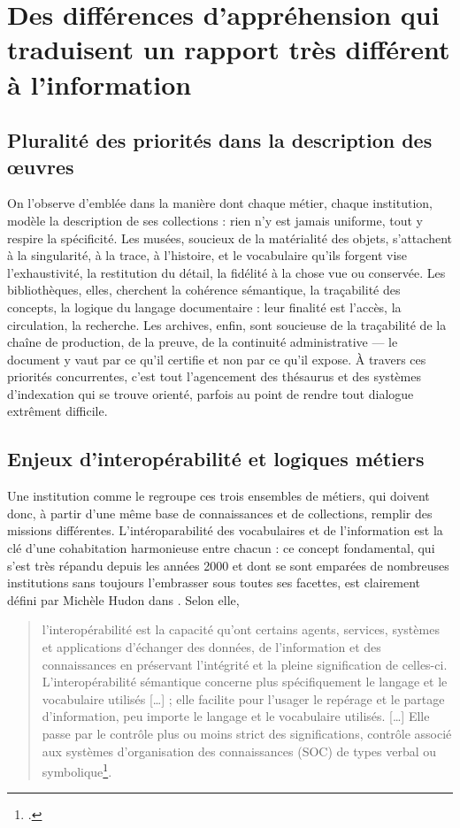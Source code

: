 \section{\label{II-B-2}Des différences d’appréhension qui traduisent un rapport très différent à l’information}


\subsection{Pluralité des priorités dans la description des œuvres}

On l’observe d’emblée dans la manière dont chaque métier, chaque institution, modèle la description de ses collections : rien n’y est jamais uniforme, tout y respire la spécificité. Les musées, soucieux de la matérialité des objets, s’attachent à la singularité, à la trace, à l’histoire, et le vocabulaire qu’ils forgent vise l’exhaustivité, la restitution du détail, la fidélité à la chose vue ou conservée. Les bibliothèques, elles, cherchent la cohérence sémantique, la traçabilité des concepts, la logique du langage documentaire : leur finalité est l’accès, la circulation, la recherche. Les archives, enfin, sont soucieuse de la traçabilité de la chaîne de production, de la preuve, de la continuité administrative — le document y vaut par ce qu’il certifie et non par ce qu’il expose. À travers ces priorités concurrentes, c’est tout l’agencement des thésaurus et des systèmes d’indexation qui se trouve orienté, parfois au point de rendre tout dialogue extrêment difficile.

\subsection{Enjeux d’interopérabilité et logiques métiers}

Une institution comme le \mae regroupe ces trois ensembles de métiers, qui doivent donc, à partir d'une même base de connaissances et de collections, remplir des missions différentes. L'intéroparabilité des vocabulaires et de l'information est la clé d'une cohabitation harmonieuse entre chacun : ce concept fondamental, qui s'est très répandu depuis les années 2000 et dont se sont emparées de nombreuses institutions sans toujours l'embrasser sous toutes ses facettes, est clairement défini par Michèle Hudon dans . Selon elle, 
\begin{quote}
	l’interopérabilité est la capacité qu’ont certains agents, services, systèmes et applications d’échanger des données, de l’information et des connaissances en préservant l’intégrité et la pleine signification de celles-ci. L’interopérabilité sémantique concerne plus spécifiquement le langage et le vocabulaire utilisés […] ; elle facilite pour l’usager le repérage et le partage d’information, peu importe le langage et le vocabulaire utilisés. […] Elle passe par le contrôle plus ou moins strict des significations, contrôle associé aux systèmes d’organisation des connaissances (SOC) de types verbal ou symbolique\footcite{hudonISO25964Pour2012a}.
\end{quote}

